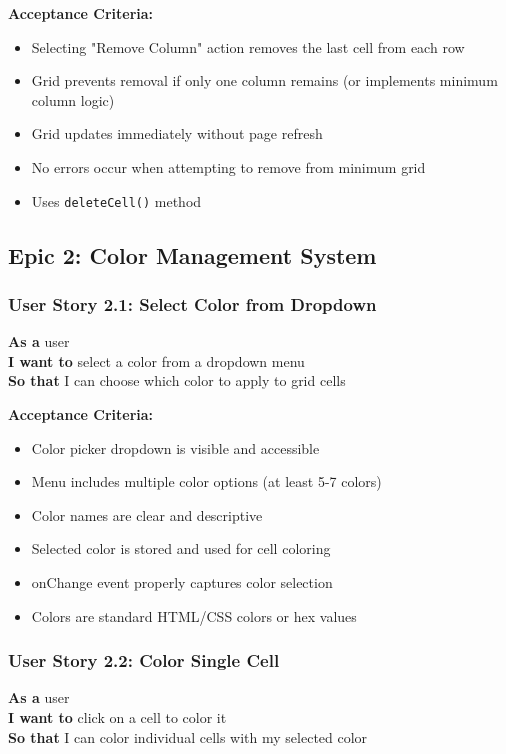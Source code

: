 \documentclass[11pt,a4paper]{article}
\begin{document}
\textbf{Acceptance Criteria:}
\begin{itemize}[leftmargin=*]
    \item Selecting "Remove Column" action removes the last cell from each row
    \item Grid prevents removal if only one column remains (or implements minimum column logic)
    \item Grid updates immediately without page refresh
    \item No errors occur when attempting to remove from minimum grid
    \item Uses \texttt{deleteCell()} method
\end{itemize}

\subsection{Epic 2: Color Management System}

\subsubsection{User Story 2.1: Select Color from Dropdown}
\textbf{As a} user\\
\textbf{I want to} select a color from a dropdown menu\\
\textbf{So that} I can choose which color to apply to grid cells

\textbf{Acceptance Criteria:}
\begin{itemize}[leftmargin=*]
    \item Color picker dropdown is visible and accessible
    \item Menu includes multiple color options (at least 5-7 colors)
    \item Color names are clear and descriptive
    \item Selected color is stored and used for cell coloring
    \item onChange event properly captures color selection
    \item Colors are standard HTML/CSS colors or hex values
\end{itemize}

\subsubsection{User Story 2.2: Color Single Cell}
\textbf{As a} user\\
\textbf{I want to} click on a cell to color it\\
\textbf{So that} I can color individual cells with my selected color
\end{document}
